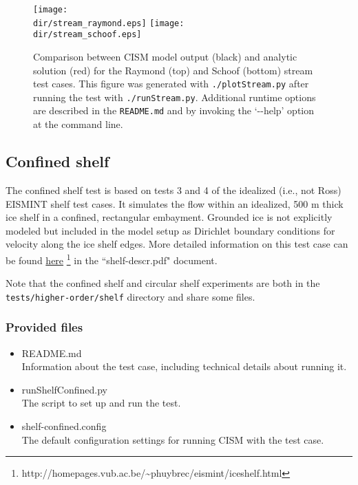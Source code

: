 	
\begin{figure}[H!]
  \begin{center}
	\texttt{[image: \\dir/stream\_raymond.eps]}
	\texttt{[image: \\dir/stream\_schoof.eps]}
  \end{center}
  \caption{Comparison between CISM model output (black) and analytic solution (red) for the Raymond (top) and Schoof (bottom) stream test cases. This figure was generated with \texttt{./plotStream.py} after running the test with \texttt{./runStream.py}.
Additional runtime options are described in the \texttt{README.md} and by invoking the `-{}-help' option at the command line.}
  \label{fig:stream-results}
\end{figure} 

\subsection{Confined shelf}
The confined shelf test is based on tests 3 and 4 of the idealized (i.e., not Ross) EISMINT shelf test 
cases.  It simulates the flow within an idealized, 500 m thick ice shelf in a 
confined, rectangular embayment.  Grounded ice is not explicitly modeled but included in the 
model setup as Dirichlet boundary conditions for velocity along the ice shelf edges.
More detailed information on this test case can be found 
\href{http://homepages.vub.ac.be/~phuybrec/eismint/iceshelf.html}{here}
\footnote{http://homepages.vub.ac.be/\textasciitilde{}phuybrec/eismint/iceshelf.html} in the 
``shelf-descr.pdf" document.

Note that the confined shelf and circular shelf experiments are both in the 
\texttt{tests/higher-order/shelf} directory and share some files.

\subsubsection{Provided files}

\begin{itemize}
	\item README.md \\
		Information about the test case, including technical details about running it.
	\item runShelfConfined.py \\
		The script to set up and run the test.
	\item shelf-confined.config \\
  The default configuration settings for running CISM with the test case.
\end{itemize}

